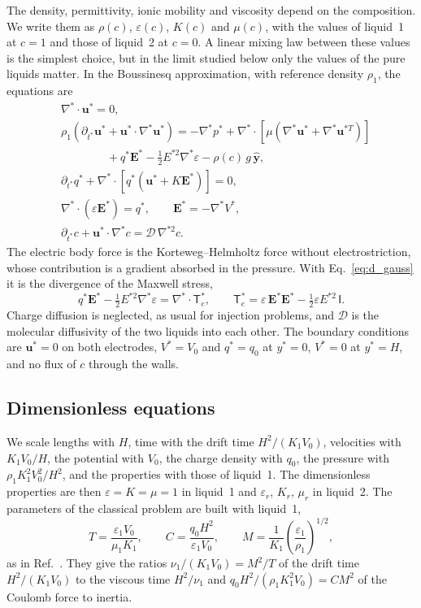 \documentclass[aip,pof,reprint,amsmath,amssymb]{revtex4-2}
\newcommand{\bu}{\bm{u}}
\newcommand{\bE}{\bm{E}}
\begin{document}
The density, permittivity, ionic mobility and viscosity depend on the composition. We write
them as $\rho(c)$, $\varepsilon(c)$, $K(c)$ and $\mu(c)$, with the values of liquid~1 at
$c=1$ and those of liquid~2 at $c=0$. A linear mixing law between these values is the
simplest choice, but in the limit studied below only the values of the pure liquids
matter. In the Boussinesq approximation, with reference density $\rho_1$, the equations are
\begin{align}
&\nabla^*\!\cdot\bu^*=0,\label{eq:d_mass}\\
&\rho_1\left(\partial_{t^*}\bu^*+\bu^*\cdot\nabla^*\bu^*\right)=-\nabla^*p^*
+\nabla^*\!\cdot\left[\mu\left(\nabla^*\bu^*+\nabla^*\bu^{*T}\right)\right]\nonumber\\
&\qquad\qquad+q^*\bE^*-\tfrac12E^{*2}\nabla^*\varepsilon-\rho(c)\,g\,\hat{\bm y},
\label{eq:d_ns}\\
&\partial_{t^*}q^*+\nabla^*\!\cdot\left[q^*\left(\bu^*+K\bE^*\right)\right]=0,
\label{eq:d_charge}\\
&\nabla^*\!\cdot\left(\varepsilon\bE^*\right)=q^*,\qquad \bE^*=-\nabla^*V^*,
\label{eq:d_gauss}\\
&\partial_{t^*}c+\bu^*\cdot\nabla^*c=\mathcal{D}\,\nabla^{*2}c .\label{eq:d_conc}
\end{align}
The electric body force is the Korteweg--Helmholtz force without electrostriction, whose
contribution is a gradient absorbed in the pressure. With Eq.~\eqref{eq:d_gauss} it is the
divergence of the Maxwell stress,
\begin{equation}
q^*\bE^*-\tfrac12E^{*2}\nabla^*\varepsilon=\nabla^*\!\cdot\mathsf T^*_e,\qquad
\mathsf T^*_e=\varepsilon\,\bE^*\bE^*-\tfrac12\varepsilon E^{*2}\,\mathsf I .
\label{eq:d_maxwell}
\end{equation}
Charge diffusion is neglected, as usual for injection problems, and $\mathcal D$ is the
molecular diffusivity of the two liquids into each other. The boundary conditions are
$\bu^*=0$ on both electrodes, $V^*=V_0$ and $q^*=q_0$ at $y^*=0$, $V^*=0$ at $y^*=H$, and no
flux of $c$ through the walls.

\subsection{Dimensionless equations}

We scale lengths with $H$, time with the drift time $H^2/(K_1V_0)$, velocities with
$K_1V_0/H$, the potential with $V_0$, the charge density with $q_0$, the pressure with
$\rho_1K_1^2V_0^2/H^2$, and the properties with those of liquid~1. The dimensionless
properties are then $\varepsilon=K=\mu=1$ in liquid~1 and $\varepsilon_r$, $K_r$, $\mu_r$ in
liquid~2. The parameters of the classical problem are built with liquid~1,
\begin{equation}
T=\frac{\varepsilon_1V_0}{\mu_1K_1},\qquad C=\frac{q_0H^2}{\varepsilon_1V_0},\qquad
M=\frac{1}{K_1}\left(\frac{\varepsilon_1}{\rho_1}\right)^{1/2},
\end{equation}
as in Ref.~. They give the ratios $\nu_1/(K_1V_0)=M^2/T$ of the
drift time $H^2/(K_1V_0)$ to the viscous time $H^2/\nu_1$ and $q_0H^2/(\rho_1K_1^2V_0)=CM^2$ of the Coulomb force to
inertia.
\end{document}
